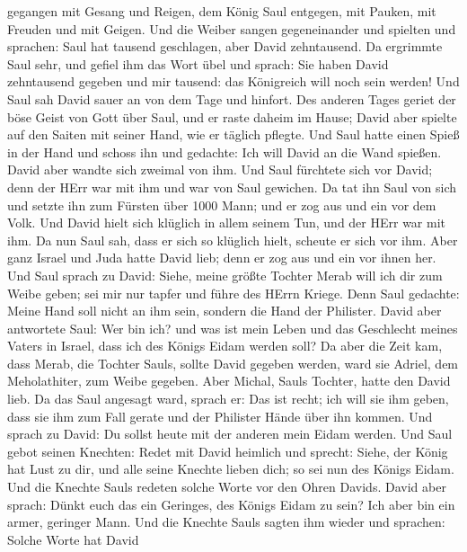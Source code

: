 gegangen mit Gesang und Reigen, dem König Saul entgegen, mit Pauken, mit
Freuden und mit Geigen.  Und die Weiber sangen gegeneinander
und spielten und sprachen: Saul hat tausend geschlagen, aber David
zehntausend.  Da ergrimmte Saul sehr, und gefiel ihm das
Wort übel und sprach: Sie haben David zehntausend gegeben und mir
tausend: das Königreich will noch sein werden!  Und Saul sah
David sauer an von dem Tage und hinfort.  Des anderen Tages
geriet der böse Geist von Gott über Saul, und er raste daheim im Hause;
David aber spielte auf den Saiten mit seiner Hand, wie er täglich
pflegte. Und Saul hatte einen Spieß in der Hand  und schoss
ihn und gedachte: Ich will David an die Wand spießen. David aber wandte
sich zweimal von ihm.  Und Saul fürchtete sich vor David;
denn der HErr war mit ihm und war von Saul gewichen.  Da
tat ihn Saul von sich und setzte ihn zum Fürsten über 1000 Mann; und er
zog aus und ein vor dem Volk.  Und David hielt sich
klüglich in allem seinem Tun, und der HErr war mit ihm.  Da
nun Saul sah, dass er sich so klüglich hielt, scheute er sich vor ihm.
 Aber ganz Israel und Juda hatte David lieb; denn er zog
aus und ein vor ihnen her.  Und Saul sprach zu David:
Siehe, meine größte Tochter Merab will ich dir zum Weibe geben; sei mir
nur tapfer und führe des HErrn Kriege. Denn Saul gedachte: Meine Hand
soll nicht an ihm sein, sondern die Hand der Philister. 
David aber antwortete Saul: Wer bin ich? und was ist mein Leben und das
Geschlecht meines Vaters in Israel, dass ich des Königs Eidam werden
soll?  Da aber die Zeit kam, dass Merab, die Tochter Sauls,
sollte David gegeben werden, ward sie Adriel, dem Meholathiter, zum
Weibe gegeben.  Aber Michal, Sauls Tochter, hatte den David
lieb. Da das Saul angesagt ward, sprach er: Das ist recht; 
ich will sie ihm geben, dass sie ihm zum Fall gerate und der Philister
Hände über ihn kommen. Und sprach zu David: Du sollst heute mit der
anderen mein Eidam werden.  Und Saul gebot seinen Knechten:
Redet mit David heimlich und sprecht: Siehe, der König hat Lust zu dir,
und alle seine Knechte lieben dich; so sei nun des Königs Eidam.
 Und die Knechte Sauls redeten solche Worte vor den Ohren
Davids. David aber sprach: Dünkt euch das ein Geringes, des Königs Eidam
zu sein? Ich aber bin ein armer, geringer Mann.  Und die
Knechte Sauls sagten ihm wieder und sprachen: Solche Worte hat David
